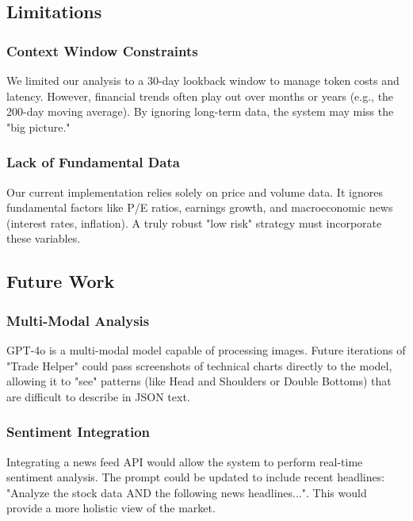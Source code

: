 \subsection{Limitations}
\subsubsection{Context Window Constraints}
We limited our analysis to a 30-day lookback window to manage token costs and latency. However, financial trends often play out over months or years (e.g., the 200-day moving average). By ignoring long-term data, the system may miss the "big picture."
\subsubsection{Lack of Fundamental Data}
Our current implementation relies solely on price and volume data. It ignores fundamental factors like P/E ratios, earnings growth, and macroeconomic news (interest rates, inflation). A truly robust "low risk" strategy must incorporate these variables.

\subsection{Future Work}
\subsubsection{Multi-Modal Analysis}
GPT-4o is a multi-modal model capable of processing images. Future iterations of "Trade Helper" could pass screenshots of technical charts directly to the model, allowing it to "see" patterns (like Head and Shoulders or Double Bottoms) that are difficult to describe in JSON text.
\subsubsection{Sentiment Integration}
Integrating a news feed API would allow the system to perform real-time sentiment analysis. The prompt could be updated to include recent headlines: "Analyze the stock data AND the following news headlines...". This would provide a more holistic view of the market.
